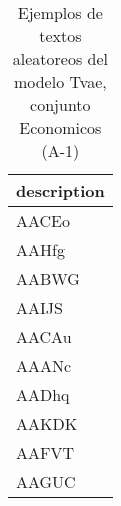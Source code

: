 \begin{table}[H]
\centering
\fontsize{8}{14}\selectfont
\caption{Ejemplos de textos aleatoreos del modelo Tvae, conjunto Economicos (A-1)}
\label{table-sample10-economicos-a-1-tvae-text}
\begin{tabular}{|m{50em}|}
\hline
\rowcolor[gray]{0.8}
description \\
\hline AACEo \\
\hline AAHfg \\
\hline AABWG \\
\hline AAIJS \\
\hline AACAu \\
\hline AAANc \\
\hline AADhq \\
\hline AAKDK \\
\hline AAFVT \\
\hline AAGUC \\
\hline
\end{tabular}
\end{table}
